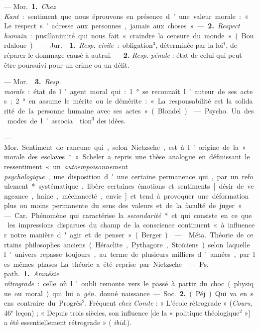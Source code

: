 \begin{itemize}[leftmargin=1cm, label=, itemsep=1pt]
 — \si{Mor.} {\bf 1.} {\it Chez Kant} : sentiment que nous
éprouvons en présence d’une valeur morale : « Le respect s’adresse aux
personnes, jamais aux choses » — {\bf 2.} {\it Respect humain} :
pusillanimité qui nous fait « craindre la censure du monde » (Bourdaloue).

 — \si{Jur.}  {\bf 1.} {\it Resp. civile} :
obligation$^3$, déterminée par la loi$^1$, de réparer le dommage causé à
autrui. — {\bf 2.} {\it Resp. pénale} : état de celui qui peut être poursuivi
pour un crime ou un délit.

— \si{Mor.}  {\bf 3.} {\it Resp. morale} : état de l'agent
moral qui : 1° se reconnaît l’auteur de ses actes; 2° en assume le mérite ou
le démérite : « La responsabilité est la solidarité de la personne humaine
avec ses actes » (Blondel).

 — \si{Psycho.} Un des modes de
l’associa\-tion$^3$ des idées.

 — \si{Mor.} Sentiment de rancune qui, selon Nietzsche, est
à l’origine de la « morale des esclaves* ». Scheler a repris une thèse
analogue en définissant le ressentiment « un {\it autoempoisonnement
psychologique},... une disposition d'une certaine permanence qui, par un
refoulement* systématique, libère certaines émotions et sentiments [désir de
vengeance, haine, méchanceté, envie] et tend à provoquer une déformation plus
ou moins permanente du sens des valeurs et de la faculté de juger ».

 — \si{Car.} Phénomène qui caractérise la
{\it secondarité}* et qui consiste en ce que les impressions disparues du
champ de la conscience continuent « à influencer notre manière d'agir et de
penser » (Berger).

 —  \si{Méta.} Théorie de certains
philosophes anciens (Héraclite, Pythagore, Stoïciens) selon laquelle
l'univers repasse toujours, au terme de plusieurs milliers d'années, par les
mêmes phases. La théorie a été reprise par Nietzsche.

 — \si{Ps. path.} {\bf 1.} {\it Amnésie rétrograde} : celle où
l'oubli remonte vers le passé à partir du choc (physique ou moral) qui lui a
{\it gén.} donné naissance. — \si{Soc.} {\bf 2.} (Péj.) Qui va en sens
contraire du Progrès$^2$. Fréquent {\it chez Comte} : « L'école rétrograde
» ({\it Cours}, 46$^\text{e}$ leçon) ; « Depuis trois siècles, son influence
[de la « politique théologique$^2$ »] a été essentiellement rétrograde » ({\it
ibid.}).


\end{itemize}
